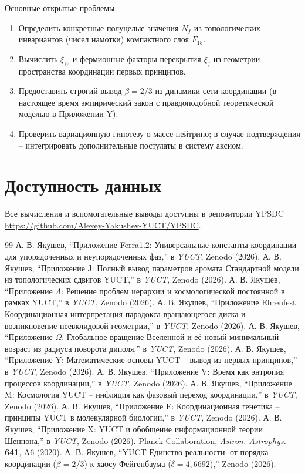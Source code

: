 \documentclass[12pt,a4paper]{article}
\begin{document}
	Основные открытые проблемы:
	\begin{enumerate}[label=(\roman*)]
		\item Определить конкретные полуцелые значения \(N_f\) из топологических инвариантов (чисел намотки) компактного слоя \(F_{15}\).
		\item Вычислить \(\xi_W\) и фермионные факторы перекрытия \(\xi_f\) из геометрии пространства координации первых принципов.
		\item Предоставить строгий вывод \(\beta = 2/3\) из динамики сети координации (в настоящее время эмпирический закон с правдоподобной теоретической моделью в Приложении Y).
		\item Проверить вариационную гипотезу о массе нейтрино; в случае подтверждения – интегрировать дополнительные постулаты в систему аксиом.
	\end{enumerate}
	
	\section*{Доступность данных}
	Все вычисления и вспомогательные выводы доступны в репозитории YPSDC \url{https://github.com/Alexey-Yakushev-YUCT/YPSDC}.
	
	\begin{thebibliography}{99}
		 А. В. Якушев, ``Приложение Ferra1.2: Универсальные константы координации для упорядоченных и неупорядоченных фаз,'' в \emph{YUCT}, Zenodo (2026).
		 А. В. Якушев, ``Приложение J: Полный вывод параметров аромата Стандартной модели из топологических сдвигов YUCT,'' в \emph{YUCT}, Zenodo (2026).
		 А. В. Якушев, ``Приложение \(\Lambda\): Решение проблем иерархии и космологической постоянной в рамках YUCT,'' в \emph{YUCT}, Zenodo (2026).
		 А. В. Якушев, ``Приложение Ehrenfest: Координационная интерпретация парадокса вращающегося диска и возникновение неевклидовой геометрии,'' в \emph{YUCT}, Zenodo (2026).
		 А. В. Якушев, ``Приложение \(\Omega\): Глобальное вращение Вселенной и её новый минимальный возраст из радиуса поворота диполя,'' в \emph{YUCT}, Zenodo (2026).
		 А. В. Якушев, ``Приложение Y: Математические основы YUCT – вывод из первых принципов,'' в \emph{YUCT}, Zenodo (2026).
		 А. В. Якушев, ``Приложение V: Время как энтропия процессов координации,'' в \emph{YUCT}, Zenodo (2026).
		 А. В. Якушев, ``Приложение M: Космология YUCT – инфляция как фазовый переход координации,'' в \emph{YUCT}, Zenodo (2026).
		 А. В. Якушев, ``Приложение E: Координационная генетика – принципы YUCT в молекулярной биологии,'' в \emph{YUCT}, Zenodo (2026).
		 А. В. Якушев, ``Приложение X: YUCT и обобщение информационной теории Шеннона,'' в \emph{YUCT}, Zenodo (2026).
		 Planck Collaboration, \emph{Astron. Astrophys.} \textbf{641}, A6 (2020).
		 А. В. Якушев, ``YUCT Единство реальности: от порядка координации (\(\beta = 2/3\)) к хаосу Фейгенбаума (\(\delta = 4,6692\)),'' Zenodo (2026).
	\end{thebibliography}
	
\end{document}
